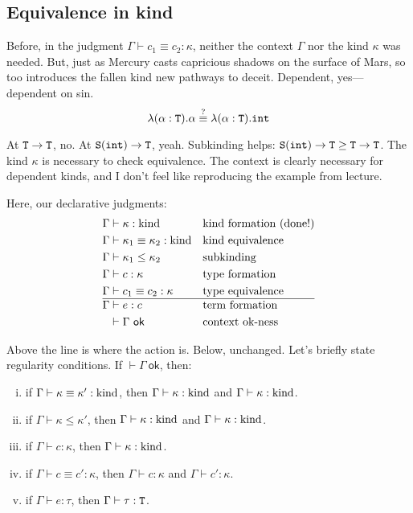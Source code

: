 \subsection{Equivalence in kind}
Before, in the judgment $\Gamma \vdash c_1 \equiv c_2 : \kappa$, neither the context
$\Gamma$ nor the kind $\kappa$ was needed. But, just as Mercury
casts capricious shadows on the surface of Mars, so too introduces the fallen
kind new pathways to deceit. Dependent, yes---dependent on sin.
\[\lambda(\alpha : \textnormal{\texttt{T}}).\alpha \stackrel{?}{\equiv} \lambda(\alpha:\textnormal{\texttt{T}}).\textnormal{\texttt{int}}\]

At $\textnormal{\texttt{T}} \to \textnormal{\texttt{T}}$, no. At $\textnormal{\texttt{S}}(\textnormal{\texttt{int}}) \to \textnormal{\texttt{T}}$, yeah. Subkinding helps:
$\textnormal{\texttt{S}}(\textnormal{\texttt{int}}) \to \textnormal{\texttt{T}} \ge \textnormal{\texttt{T}} \to \textnormal{\texttt{T}}$. The kind $\kappa$ is necessary to check
equivalence. The context is clearly necessary for dependent
kinds, and I don't feel like reproducing the example from lecture.

Here, our declarative judgments:
\begin{align*}
  \Gamma &\vdash \kappa : \textnormal{kind} &&\text{kind formation (done!)}\\
  \Gamma &\vdash \kappa_1 \equiv \kappa_2 : \textnormal{kind} &&\text{kind equivalence}\\
  \Gamma &\vdash \kappa_1 \le \kappa_2 &&\text{subkinding}\\
  \Gamma &\vdash c : \kappa &&\text{type formation}\\
  \Gamma &\vdash c_1 \equiv c_2 : \kappa &&\text{type equivalence}\\
  \hline
  \Gamma &\vdash e : c &&\text{term formation}\\
  &\vdash \Gamma~\mathsf{ok} &&\text{context ok-ness}
\end{align*}

Above the line is where the action is. Below, unchanged.
Let's briefly state regularity conditions. If $\vdash \Gamma~\mathsf{ok}$, then:
\begin{enumerate}[(i)]
  \item if $\Gamma \vdash \kappa \equiv \kappa' : \textnormal{kind}$, then $\Gamma \vdash \kappa : \textnormal{kind}$
    and $\Gamma \vdash \kappa : \textnormal{kind}$.
  \item if $\Gamma \vdash \kappa \le \kappa'$, then $\Gamma \vdash \kappa : \textnormal{kind}$
    and $\Gamma \vdash \kappa : \textnormal{kind}$.
  \item if $\Gamma \vdash c : \kappa$, then $\Gamma \vdash \kappa : \textnormal{kind}$.
  \item if $\Gamma \vdash c \equiv c' : \kappa$, then $\Gamma \vdash c : \kappa$
    and $\Gamma \vdash c' : \kappa$.
  \item if $\Gamma \vdash e : \tau$, then $\Gamma \vdash \tau : \textnormal{\texttt{T}}$.
\end{enumerate}

